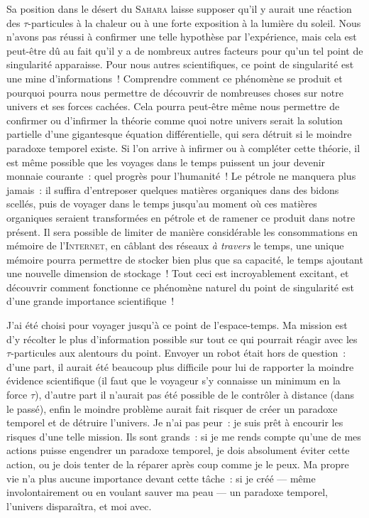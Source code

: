 {	Sa position dans le désert du \textsc{Sahara} laisse supposer qu’il y aurait une réaction des $\tau$-particules à la chaleur ou à une forte exposition à la lumière du soleil.
	Nous n’avons pas réussi à confirmer une telle hypothèse par l’expérience, mais cela est peut-être dû au fait qu’il y a de nombreux autres facteurs pour qu’un tel point de singularité apparaisse.
	Pour nous autres scientifiques, ce point de singularité est une mine d’informations~!
	Comprendre comment ce phénomène se produit et pourquoi pourra nous permettre de découvrir de nombreuses choses sur notre univers et ses forces cachées.
	Cela pourra peut-être même nous permettre de confirmer ou d’infirmer la théorie comme quoi notre univers serait la solution partielle d’une gigantesque équation différentielle, qui sera détruit si le moindre paradoxe temporel existe.
	Si l’on arrive à infirmer ou à compléter cette théorie, il est même possible que les voyages dans le temps puissent un jour devenir monnaie courante~:  quel progrès pour l’humanité~!
	Le pétrole ne manquera plus jamais~:  il suffira d’entreposer quelques matières organiques dans des bidons scellés, puis de voyager dans le temps jusqu’au moment où ces matières organiques seraient transformées en pétrole et de ramener ce produit dans notre présent.
	Il sera possible de limiter de manière considérable les consommations en mémoire de l’\textsc{Internet}, en câblant des réseaux \emph{à travers} le temps, une unique mémoire pourra permettre de stocker bien plus que sa capacité, le temps ajoutant une nouvelle dimension de stockage~!
	Tout ceci est incroyablement excitant, et découvrir comment fonctionne ce phénomène naturel du point de singularité est d’une grande importance scientifique~!

	J’ai été choisi pour voyager jusqu’à ce point de l’espace-temps.
	Ma mission est d’y récolter le plus d’information possible sur tout ce qui pourrait réagir avec les $\tau$-particules aux alentours du point.
	Envoyer un robot était hors de question~:  d’une part, il aurait été beaucoup plus difficile pour lui de rapporter la moindre évidence scientifique (il faut que le voyageur s’y connaisse un minimum en la force $\tau$), d’autre part il n’aurait pas été possible de le contrôler à distance (dans le passé), enfin le moindre problème aurait fait risquer de créer un paradoxe temporel et de détruire l’univers.
	Je n’ai pas peur~:  je suis prêt à encourir les risques d’une telle mission.
	Ils sont grands~:  si je me rends compte qu’une de mes actions puisse engendrer un paradoxe temporel, je dois absolument éviter cette action, ou je dois tenter de la réparer après coup comme je le peux.
	Ma propre vie n’a plus aucune importance devant cette tâche~:  si je créé — même involontairement ou en voulant sauver ma peau — un paradoxe temporel, l’univers disparaîtra, et moi avec.

}
